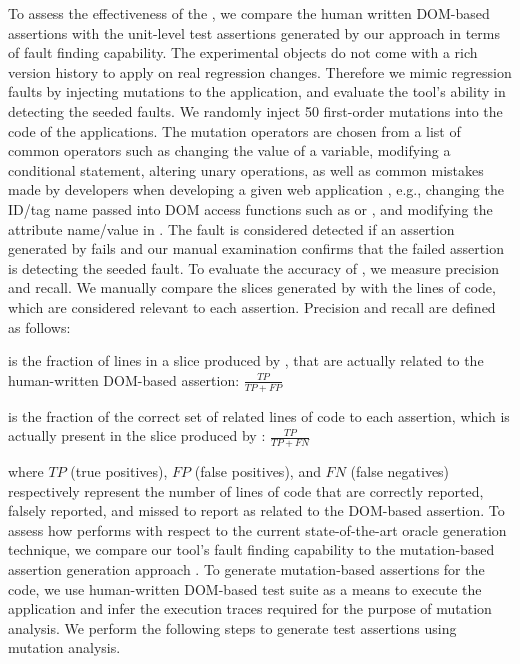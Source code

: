  To assess the effectiveness of the \tool, we compare the human written DOM-based assertions with the unit-level test assertions generated by our approach in terms of fault finding capability.
The experimental objects do not come with a rich version history to apply \tool on real regression changes. Therefore we mimic regression faults by injecting mutations to the application, and evaluate the tool's ability in detecting the seeded faults. We randomly inject 50 first-order mutations into the \javascript code of the applications. The mutation operators are chosen from a list of common operators such as changing the value of a variable, modifying a conditional statement, altering unary operations, as well as common mistakes made by developers when developing a given web application \cite{mirshokraie:tse15}, e.g., changing the ID/tag name passed into DOM access functions such as  or , and modifying the attribute name/value in . The fault is considered detected if an assertion generated by \tool fails and our manual examination confirms that the failed assertion is detecting the seeded fault.
 To evaluate the accuracy of \tool, we measure precision and recall. We manually compare the slices generated by \tool with the \javascript lines of code, which are considered relevant to each assertion. Precision and recall are defined as follows:
\begin{description}[noitemsep, nolistsep, font=\normalfont\itshape]
\item [Precision] is the fraction of lines in a slice produced by \tool, that are actually related to the human-written DOM-based assertion: $\frac{TP}{TP+FP}$ 
\item [Recall] is the fraction of the correct set of related lines of code to each assertion, which is actually present in the slice produced by \tool: $\frac{TP}{TP+FN}$ 
\end{description}
where $TP$ (true positives), $FP$ (false positives), and $FN$ (false negatives) respectively represent the number of lines of code that are correctly reported, falsely reported, and missed to report as related to the DOM-based assertion.
 To assess how \tool performs with respect to the current state-of-the-art oracle generation technique, we compare our tool's fault finding capability to the mutation-based assertion generation approach \cite{mirshokraie:icst15, fraser:tse12}. To generate mutation-based assertions for the \javascript code, we use human-written DOM-based test suite as a means to execute the application and infer the execution traces required for the purpose of mutation analysis. We perform the following steps to generate test assertions using mutation analysis.

